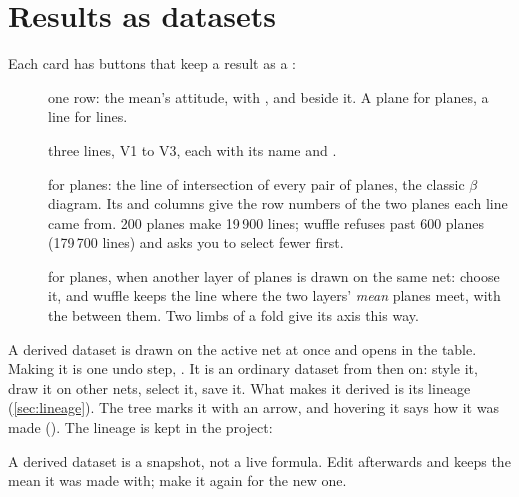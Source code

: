 \section{Results as datasets}\label{sec:derived}


Each card has buttons that keep a result as a :

\begin{description}
\item[] one row: the mean's attitude, with ,  and 
beside it. A plane for planes, a line for lines.
\item[] three lines, V1 to V3, each with its  name and
.
\item[] for planes: the line of intersection of every pair of planes, the classic
$\beta$ diagram. Its  and  columns give the row numbers of the two planes each line came
from. 200 planes make 19\,900 lines; wuffle refuses past 600 planes (179\,700 lines) and asks you to select
fewer first.
\item[] for planes, when another layer of planes is drawn on the same net: choose
it, and wuffle keeps the line where the two layers' \emph{mean} planes meet, with the  between
them. Two limbs of a fold give its axis this way.
\end{description}

A derived dataset is drawn on the active net at once and opens in the table. Making it is one undo step,
. It is an ordinary dataset from then on: style it, draw it on other nets, select it,
save it. What makes it derived is its lineage (\cref{sec:lineage}). The tree marks it with an arrow, and hovering it
says how it was made (). The lineage is kept in the project:


A derived dataset is a snapshot, not a live formula. Edit  afterwards and 
keeps the mean it was made with; make it again for the new one.

